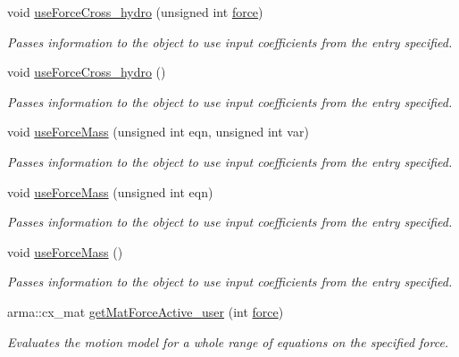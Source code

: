 \begin{DoxyCompactItemize}
void \hyperlink{classosea_1_1ofreq_1_1_motion_model_a642fb3df74231a5ad0c9f068e23f73ca}{use\-Force\-Cross\-\_\-hydro} (unsigned int \hyperlink{input__syntax_8dox_ab0a92c70357da47fe86696522eab7dc8}{force})
\begin{DoxyCompactList}\small\item\em Passes information to the object to use input coefficients from the entry specified. \end{DoxyCompactList}\item 
void \hyperlink{classosea_1_1ofreq_1_1_motion_model_a9eec7ca7d497eaff8ae8c4dff24ec5da}{use\-Force\-Cross\-\_\-hydro} ()
\begin{DoxyCompactList}\small\item\em Passes information to the object to use input coefficients from the entry specified. \end{DoxyCompactList}\item 
void \hyperlink{classosea_1_1ofreq_1_1_motion_model_aecaf9f0261355cff2acf602acd728644}{use\-Force\-Mass} (unsigned int eqn, unsigned int var)
\begin{DoxyCompactList}\small\item\em Passes information to the object to use input coefficients from the entry specified. \end{DoxyCompactList}\item 
void \hyperlink{classosea_1_1ofreq_1_1_motion_model_a5c3368c9b82042765c2b542cfa78c200}{use\-Force\-Mass} (unsigned int eqn)
\begin{DoxyCompactList}\small\item\em Passes information to the object to use input coefficients from the entry specified. \end{DoxyCompactList}\item 
void \hyperlink{classosea_1_1ofreq_1_1_motion_model_a1478e13916cc181bbedca771b6c83695}{use\-Force\-Mass} ()
\begin{DoxyCompactList}\small\item\em Passes information to the object to use input coefficients from the entry specified. \end{DoxyCompactList}\item 
arma\-::cx\-\_\-mat \hyperlink{classosea_1_1ofreq_1_1_motion_model_af9d30b6afa16093429fab496d18c5d00}{get\-Mat\-Force\-Active\-\_\-user} (int \hyperlink{input__syntax_8dox_ab0a92c70357da47fe86696522eab7dc8}{force})
\begin{DoxyCompactList}\small\item\em Evaluates the motion model for a whole range of equations on the specified force. \end{DoxyCompactList}\item 

\end{DoxyCompactItemize}
